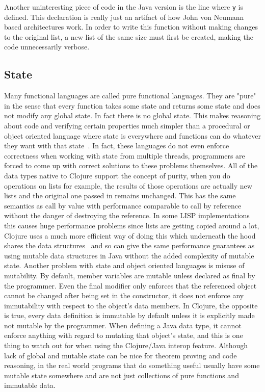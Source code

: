 Another uninteresting piece of code in the Java version is the line
where {\tt y} is defined. 
This declaration is really just an artifact of how John von Neumann based architectures work. In order to write this function without making changes to 
the original list, a new list of the same size must first be created, making the code unnecessarily verbose. 

\subsection{State}
Many functional languages are called pure functional languages. 
They are "pure" in the sense that every function takes some state and
returns some state and does not modify any global state. 
In fact there is no global state. 
This makes reasoning about code and verifying certain properties much
simpler than a procedural or object oriented language where state is
everywhere and functions can do whatever they want with that
state~\cite{process}. 
In fact, these languages do not even enforce correctness when working
with state from multiple threads, programmers are forced to come up
with correct solutions to these problems themselves.
 All of the data types native to Clojure support the concept of
 purity, when you do operations on lists for example, the results of
 those operations are actually new lists and the original one passed
 in remains unchanged. 
This has the same semantics as call by value with performance
comparable to call by reference without the danger of destroying the
reference. 
In some LISP implementations this causes huge performance problems
since lists are getting copied around a lot, Clojure uses a much more
efficient way of doing this which underneath the hood shares the data
structures~\cite{cljDataStructures} and so can give the same
performance guarantees as using mutable data structures in Java
without the added complexity of mutable state. 
Another problem with state and object oriented languages is misuse of
mutability. 
By default, member variables are mutable unless declared as final by
the programmer. 
Even the final modifier only enforces that the referenced object
cannot be changed after being set in the constructor, it does not
enforce any immutability with respect to the object's data members. 
In Clojure, the opposite is true, every data definition is immutable
by default unless it is explicitly made not mutable by the
programmer. 
When defining a Java data type, it cannot enforce anything with regard
to mutating that object's state, and this is one thing to watch out
for when using the Clojure/Java interop feature. 
Although lack of global and mutable state can be nice for theorem proving and code reasoning, in the real world programs that do something useful usually have some mutable state somewhere and are not just collections of pure functions and immutable data.  

